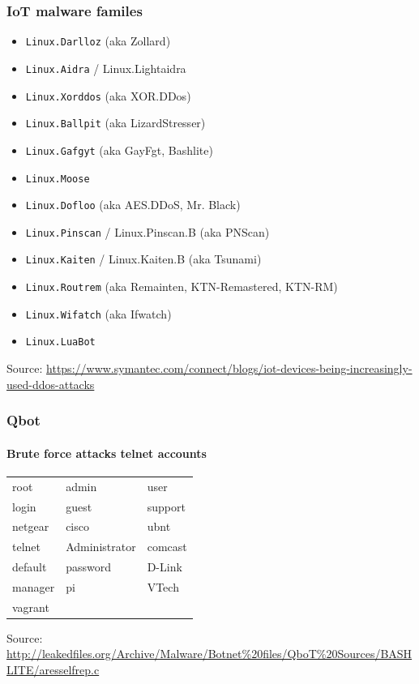\documentclass{beamer}
\begin{document}
\begin{frame}
\frametitle{IoT malware familes}
\begin{itemize}
    \item \texttt{Linux.Darlloz} (aka Zollard)
    \item \texttt{Linux.Aidra} / Linux.Lightaidra
    \item \texttt{Linux.Xorddos} (aka XOR.DDos)
    \item \texttt{Linux.Ballpit} (aka LizardStresser)
    \item \texttt{Linux.Gafgyt} (aka GayFgt, Bashlite)
    \item \texttt{Linux.Moose}
    \item \texttt{Linux.Dofloo} (aka AES.DDoS, Mr. Black)
    \item \texttt{Linux.Pinscan} / Linux.Pinscan.B (aka PNScan)
    \item \texttt{Linux.Kaiten} / Linux.Kaiten.B (aka Tsunami)
    \item \texttt{Linux.Routrem} (aka Remainten, KTN-Remastered, KTN-RM)
    \item \texttt{Linux.Wifatch} (aka Ifwatch)
    \item \texttt{Linux.LuaBot}
\end{itemize}

    {\tiny Source: \url{https://www.symantec.com/connect/blogs/iot-devices-being-increasingly-used-ddos-attacks}}
\end{frame}

\begin{frame}
\frametitle{Qbot}
\framesubtitle{Brute force attacks telnet accounts}

\begin{center}
    \begin{tabular}{lll}
        root &  admin &  user\\
        login & guest & support\\
        \alert{netgear} & \alert{cisco} & ubnt \\
        telnet & Administrator & comcast\\
        default & password & \alert{D-Link}\\
        manager & \alert{pi} & \alert{VTech} \\
        vagrant & & \\
    \end{tabular}
\end{center}

\vspace{2em}
{\tiny Source: \url{http://leakedfiles.org/Archive/Malware/Botnet\%20files/QboT\%20Sources/BASHLITE/aresselfrep.c}}

\end{frame}
\end{document}

